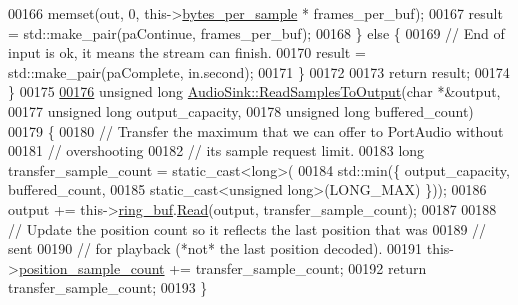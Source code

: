 \begin{DoxyCode}
00166         memset(out, 0, this->\hyperlink{classAudioSink_a5eab0f7111187c0416feb542010e4a2e}{bytes\_per\_sample} * frames\_per\_buf);
00167         result = std::make\_pair(paContinue, frames\_per\_buf);
00168     \} \textcolor{keywordflow}{else} \{
00169         \textcolor{comment}{// End of input is ok, it means the stream can finish.}
00170         result = std::make\_pair(paComplete, in.second);
00171     \}
00172 
00173     \textcolor{keywordflow}{return} result;
00174 \}
00175 
\hypertarget{audio__sink_8cpp_source_l00176}{}\hyperlink{classAudioSink_a00ed918435d6f65b9533869453d5ae56}{00176} \textcolor{keywordtype}{unsigned} \textcolor{keywordtype}{long} \hyperlink{classAudioSink_a00ed918435d6f65b9533869453d5ae56}{AudioSink::ReadSamplesToOutput}(\textcolor{keywordtype}{char} *&output,
00177                                              \textcolor{keywordtype}{unsigned} \textcolor{keywordtype}{long} output\_capacity,
00178                                              \textcolor{keywordtype}{unsigned} \textcolor{keywordtype}{long} buffered\_count)
00179 \{
00180     \textcolor{comment}{// Transfer the maximum that we can offer to PortAudio without}
00181     \textcolor{comment}{// overshooting}
00182     \textcolor{comment}{// its sample request limit.}
00183     \textcolor{keywordtype}{long} transfer\_sample\_count = \textcolor{keyword}{static\_cast<}\textcolor{keywordtype}{long}\textcolor{keyword}{>}(
00184                     std::min(\{ output\_capacity, buffered\_count,
00185                            \textcolor{keyword}{static\_cast<}\textcolor{keywordtype}{unsigned} \textcolor{keywordtype}{long}\textcolor{keyword}{>}(LONG\_MAX) \}));
00186     output += this->\hyperlink{classAudioSink_a87184f85d6cfcc7310043b877caeaee2}{ring\_buf}.\hyperlink{classRingBuffer_af892330ee102bd50a493b8afa814a0f0}{Read}(output, transfer\_sample\_count);
00187 
00188     \textcolor{comment}{// Update the position count so it reflects the last position that was}
00189     \textcolor{comment}{// sent}
00190     \textcolor{comment}{// for playback (*not* the last position decoded).}
00191     this->\hyperlink{classAudioSink_ac3403a492b8aba8d483961d1ec09fa26}{position\_sample\_count} += transfer\_sample\_count;
00192     \textcolor{keywordflow}{return} transfer\_sample\_count;
00193 \}
\end{DoxyCode}
